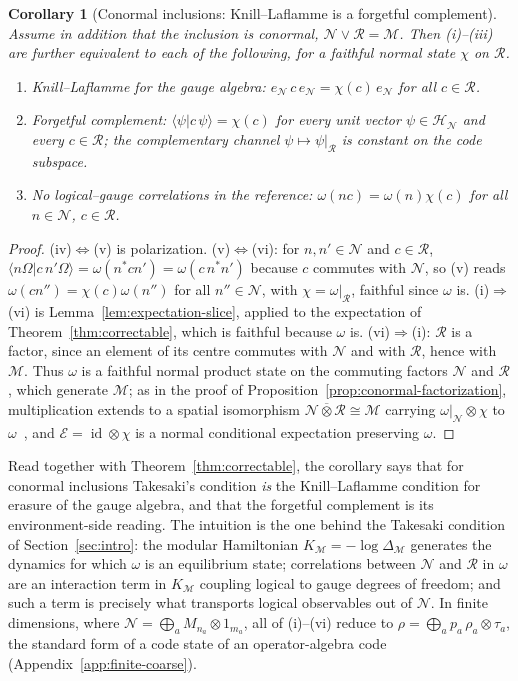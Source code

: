 \documentclass[a4paper,11pt]{article}
\newtheorem{corollary}[theorem]{Corollary}
\theoremstyle{definition}
\newcommand{\mR}{\mathcal{R}}
\newcommand{\mN}{\mathcal{N}}
\newcommand{\mH}{\mathcal{H}}
\newcommand{\mM}{\mathcal{M}}
\newcommand{\mE}{\mathcal{E}}
\begin{document}
\begin{corollary}[Conormal inclusions: Knill--Laflamme is a forgetful complement]\label{cor:KL-conormal}
Assume in addition that the inclusion is conormal, $\mN\vee\mR=\mM$. Then {\rm(i)--(iii)} are further equivalent to each of the following, for a faithful normal state $\chi$ on $\mR$.
\begin{enumerate}
 \item[\rm(iv)] \emph{Knill--Laflamme for the gauge algebra:} $e_{\mN}\,c\,e_{\mN}=\chi(c)\,e_{\mN}$ for all $c\in\mR$.
 \item[\rm(v)] \emph{Forgetful complement:} $\langle\psi|c\,\psi\rangle=\chi(c)$ for every unit vector $\psi\in\mH_{\mN}$ and every $c\in\mR$; the complementary channel $\psi\mapsto\psi|_{\mR}$ is constant on the code subspace.
 \item[\rm(vi)] \emph{No logical--gauge correlations in the reference:} $\omega(nc)=\omega(n)\chi(c)$ for all $n\in\mN$, $c\in\mR$.
\end{enumerate}
\end{corollary}

\begin{proof}
(iv)$\Leftrightarrow$(v) is polarization. (v)$\Leftrightarrow$(vi): for $n,n'\in\mN$ and $c\in\mR$, $\langle n\Omega|c\,n'\Omega\rangle=\omega(n^*cn')=\omega(c\,n^*n')$ because $c$ commutes with $\mN$, so (v) reads $\omega(cn'')=\chi(c)\omega(n'')$ for all $n''\in\mN$, with $\chi=\omega|_{\mR}$, faithful since $\omega$ is. (i)$\Rightarrow$(vi) is Lemma~\ref{lem:expectation-slice}, applied to the expectation of Theorem~\ref{thm:correctable}, which is faithful because $\omega$ is. (vi)$\Rightarrow$(i): $\mR$ is a factor, since an element of its centre commutes with $\mN$ and with $\mR$, hence with $\mM$. Thus $\omega$ is a faithful normal product state on the commuting factors $\mN$ and $\mR$, which generate $\mM$; as in the proof of Proposition~\ref{prop:conormal-factorization}, multiplication extends to a spatial isomorphism $\mN\overline\otimes\mR\cong\mM$ carrying $\omega|_{\mN}\otimes\chi$ to $\omega$~\cite{DoplicherLongo1984}, and $\mE=\operatorname{id}\otimes\chi$ is a normal conditional expectation preserving $\omega$.
\end{proof}

Read together with Theorem~\ref{thm:correctable}, the corollary says that for conormal inclusions Takesaki's condition \emph{is} the Knill--Laflamme condition for erasure of the gauge algebra, and that the forgetful complement is its environment-side reading. The intuition is the one behind the Takesaki condition of Section~\ref{sec:intro}: the modular Hamiltonian $K_{\mM}=-\log\Delta_{\mM}$ generates the dynamics for which $\omega$ is an equilibrium state; correlations between $\mN$ and $\mR$ in $\omega$ are an interaction term in $K_{\mM}$ coupling logical to gauge degrees of freedom; and such a term is precisely what transports logical observables out of $\mN$. In finite dimensions, where $\mN=\bigoplus_aM_{n_a}\otimes1_{m_a}$, all of (i)--(vi) reduce to $\rho=\bigoplus_ap_a\,\rho_a\otimes\tau_a$, the standard form of a code state of an operator-algebra code (Appendix~\ref{app:finite-coarse}).
\end{document}
